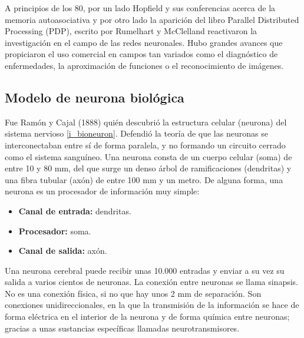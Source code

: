 \documentclass[12pt]{book} %
\begin{document}
		A principios de los 80, por un lado Hopfield y sus conferencias acerca de la memoria autoasociativa y por otro lado la aparición del libro
		Parallel Distributed Processing (PDP), escrito por Rumelhart y McClelland reactivaron la investigación en el campo de las redes neuronales.
		Hubo grandes avances que propiciaron el uso comercial en campos tan variados como el diagnóstico de enfermedades, la aproximación de 
		funciones o el reconocimiento de imágenes.
		
	\subsection{Modelo de neurona biológica}
		Fue Ramón y Cajal (1888) quién descubrió la estructura celular (neurona) del sistema nervioso \ref{i_bioneuron}.  Defendió la teoría de que 
		las neuronas se interconectaban entre sí de forma paralela, y no formando un circuito cerrado como el sistema sanguíneo.
		Una neurona consta de un cuerpo celular (soma) de entre 10 y 80 mm, del que surge un denso árbol de ramificaciones (dendritas) y una fibra
		tubular (axón) de entre 100 mm y un metro.
		De alguna forma, una neurona es un procesador de información muy simple:
		\begin{itemize}
			\item  \textbf{ Canal de entrada:} dendritas.
			\item \textbf{Procesador:} soma.
			\item \textbf{Canal de salida:} axón.
		\end{itemize}
        Una neurona cerebral puede recibir unas 10.000 entradas y enviar a su vez su salida a varios cientos de neuronas.
        La conexión entre neuronas se llama sinapsis. No es una conexión física, si no que hay unos 2 mm de separación. Son conexiones
        unidireccionales, en la que la transmisión de la información se hace de forma eléctrica en el interior de la neurona y de forma química entre
        neuronas; gracias a unas sustancias específicas llamadas neurotransmisores.
\end{document}
